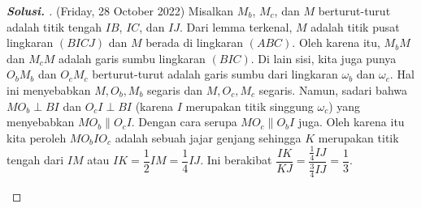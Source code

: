 \documentclass[letterpaper, 13pt]{scrartcl}
\begin{document}
\begin{proof}[\textbf{Solusi. }] (Friday, 28 October 2022) Misalkan $M_b$, $M_c$, dan $M$ berturut-turut adalah titik tengah $IB$, $IC$, dan $IJ$. Dari lemma terkenal, $M$ adalah titik pusat lingkaran $(BICJ)$ dan $M$ berada di lingkaran $(ABC)$. Oleh karena itu, $M_bM$ dan $M_cM$ adalah garis sumbu lingkaran $(BIC)$. Di lain sisi, kita juga punya $O_bM_b$ dan $O_cM_c$ berturut-turut adalah garis sumbu dari lingkaran $\omega_b$ dan $\omega_c$. Hal ini menyebabkan $M, O_b, M_b$ segaris dan $M, O_c, M_c$ segaris. Namun, sadari bahwa $MO_b \perp BI$ dan $O_cI \perp BI$ (karena $I$ merupakan titik singgung $\omega_c$) yang menyebabkan $MO_b \parallel O_cI$. Dengan cara serupa $MO_c \parallel O_bI$ juga. Oleh karena itu kita peroleh $MO_bIO_c$ adalah sebuah jajar genjang sehingga $K$ merupakan titik tengah dari $IM$ atau $IK = \dfrac{1}{2}IM = \dfrac{1}{4}IJ$. Ini berakibat $\dfrac{IK}{KJ} = \dfrac{\frac{1}{4}IJ}{\frac{3}{4}IJ}=\boxed{\dfrac{1}{3}}$.

\begin{center}
\end{center}
\end{proof}
\end{document}
